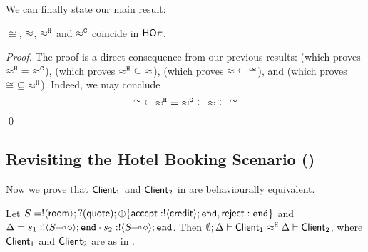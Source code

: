 We can finally state our main result:
\begin{theorem}[Coincidence]
	\label{the:coincidence}
	$\cong$, $\approx$, $\approx^\mathtt{H}$ and $\approx^\mathtt{C}$ coincide in $\mathsf{HO}\pi$. 
\end{theorem}

\begin{proof}
	The proof is a direct consequence from our previous results:
	 (which proves $\hwb\ =\ \fwb$), 
	 (which proves $\hwb\ \subseteq\ \wbc$),
	 (which proves $\wbc\ \subseteq\ \cong$), and	
	 (which proves $\cong\ \subseteq\ \hwb$).
%
Indeed, we may conclude $$\cong\ \subseteq\ \hwb\ =\ \fwb\ \subseteq\ \wbc\ \subseteq\ \cong$$
	\qed
\end{proof}
 

\subsection{Revisiting the Hotel Booking Scenario ()}
\label{ss:examprev}

Now we prove that $\mathsf{Client}_1$ and $\mathsf{Client}_2$ 
in  are behaviourally equivalent.

\begin{proposition}\label{p:examp}
	Let
	$S = ! \langle \mathsf{room} \rangle ; ? (\mathsf{quote}) ; \oplus \{\mathsf{accept}: ! \langle \mathsf{credit} \rangle ; \mathtt{end}, \mathsf{reject}: \mathtt{end}\}$
	and
	$\Delta = s_1: ! \langle S\!\! \multimap\! \diamond \rangle ; \mathtt{end} \cdot s_2: ! \langle S\!\! \multimap\! \diamond \rangle ; \mathtt{end}$.
	Then
	$\emptyset; \Delta \vdash \mathsf{Client}_1 \approx^\mathtt{H} \Delta \vdash \mathsf{Client}_2$, where $\mathsf{Client}_1$ and $\mathsf{Client}_2$ are as in . 
\end{proposition}

